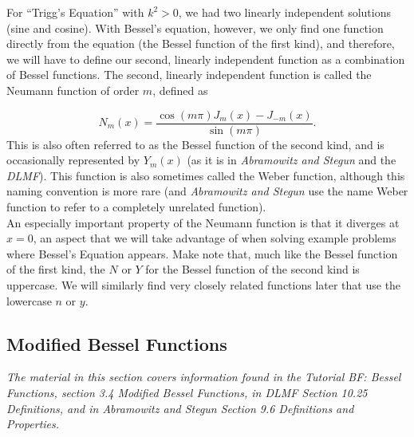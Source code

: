 \documentclass[11pt]{report}
\newcommand{\fpar}[1]{\left({#1}\right)}
\begin{document}
For ``Trigg's Equation'' with $k^2>0$, we had two linearly independent solutions (sine and cosine). With Bessel's equation, however, we only find one function directly from the equation (the Bessel function of the first kind), and therefore, we will have to define our second, linearly independent function as a combination of Bessel functions. The second, linearly independent function is called the Neumann function of order $m$, defined as

    \begin{equation}
        N_m(x) = \frac{\cos\fpar{m\pi}J_m(x)-J_{-m}(x)}{\sin\fpar{m\pi}}.
    \end{equation}
This is also often referred to as the Bessel function of the second kind, and is occasionally represented by $Y_m(x)$ (as it is in \emph{Abramowitz and Stegun} and the \emph{DLMF}). This function is also sometimes called the Weber function, although this naming convention is more rare (and \emph{Abramowitz and Stegun} use the name Weber function to refer to a completely unrelated function).\\

An especially important property of the Neumann function is that it diverges at $x=0$, an aspect that we will take advantage of when solving example problems where Bessel's Equation appears. Make note that, much like the Bessel function of the first kind, the $N$ or $Y$ for the Bessel function of the second kind is uppercase. We will similarly find very closely related functions later that use the lowercase $n$ or $y$.
    


\subsection{Modified Bessel Functions}

\emph{The material in this section covers information found in the Tutorial BF: Bessel Functions, section 3.4 Modified Bessel Functions, in DLMF Section 10.25 Definitions, and in Abramowitz and Stegun Section 9.6 Definitions and Properties.}\\
\end{document}
